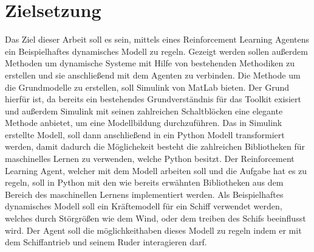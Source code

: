 \documentclass[]{iat}
\begin{document}
\section{Zielsetzung} \label{sec:zielsetzung}
Das Ziel dieser Arbeit soll es sein, mittels eines Reinforcement Learning Agentens ein Beispielhaftes dynamisches Modell zu regeln. Gezeigt werden sollen außerdem Methoden um dynamische Systeme mit Hilfe von bestehenden Methodiken zu erstellen und sie anschließend mit dem Agenten zu verbinden. Die Methode um die Grundmodelle zu erstellen, soll Simulink von MatLab bieten. Der Grund hierfür ist, da bereits ein bestehendes Grundverständnis für das Toolkit exisiert und außerdem Simulink mit seinen zahlreichen Schaltblöcken eine elegante Methode anbietet, um eine Modellbildung durchzuführen. Das in Simulink erstellte Modell, soll dann anschließend in ein Python Modell transformiert werden, damit dadurch die Möglichekeit besteht die zahlreichen Bibliotheken für maschinelles Lernen zu verwenden, welche Python besitzt. Der Reinforcement Learning Agent, welcher mit dem Modell arbeiten soll und die Aufgabe hat es zu regeln, soll in Python mit den wie bereits erwähnten Bibliotheken aus dem Bereich des maschinellen Lernens implementiert werden. Als Beispielhaftes dynamisches Modell soll ein Kräftemodell für ein Schiff verwendet werden, welches durch Störgrößen wie dem Wind, oder dem treiben des Schifs beeinflusst wird. Der Agent soll die möglichkeithaben dieses Modell zu regeln indem er mit dem Schiffantrieb und seinem Ruder interagieren darf.
\end{document}
